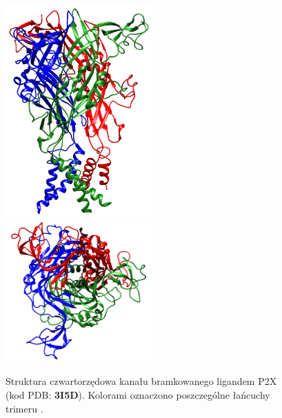 \begin{figure}[tb]
\centering
\includegraphics[width=0.5\textwidth]{rysunki/rozdzial_1/p2x.png}%
\includegraphics[width=0.5\textwidth]{rysunki/rozdzial_1/p2x2.png}%
\caption [Struktura kanału P2X]{Struktura czwartorzędowa kanału bramkowanego ligandem P2X (kod PDB: \textbf{3I5D}). Kolorami oznaczono poszczególne łańcuchy trimeru \cite{Kawate2009}.}
\label{fig:p2x}
\end{figure}

